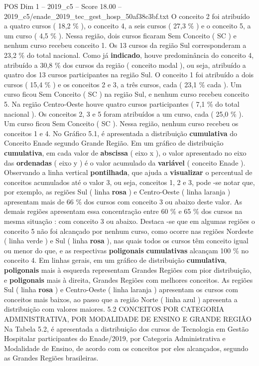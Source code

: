 \begin{textsample}{POS Dim 1 – 2019\_c5 – Score 18.00 – 2019\_c5/enade\_2019\_tec\_gest\_hosp\_50af38c3bf.txt}
O conceito 2 foi atribuído a quatro cursos ( 18,2 \% ), o conceito 4, a seis cursos ( 27,3 \% ) e o conceito 5, a um curso ( 4,5 \% ).
Nessa região, dois cursos ficaram Sem Conceito ( SC ) e nenhum curso recebeu conceito 1.
Os 13 cursos da região Sul corresponderam a 23,2 \% do total nacional.
Como já \textbf{indicado}, houve predominância do conceito 4, atribuído a 30,8 \% dos cursos da região ( conceito modal ), ou seja, atribuído a quatro dos 13 cursos participantes na região Sul.
O conceito 1 foi atribuído a dois cursos ( 15,4 \% ) e os conceitos 2 e 3, a três cursos, cada ( 23,1 \% cada ).
Um curso ficou Sem Conceito ( SC ) na região Sul, e nenhum curso recebeu conceito 5.
Na região Centro-Oeste houve quatro cursos participantes ( 7,1 \% do total nacional ).
Os conceitos 2, 3 e 5 foram atribuídos a um curso, cada ( 25,0 \% ).
Um curso ficou Sem Conceito ( SC ).
Nessa região, nenhum curso recebeu os conceitos 1 e 4.
No Gráfico 5.1, é apresentada a distribuição \textbf{cumulativa} do Conceito Enade segundo Grande Região.
Em um gráfico de distribuição \textbf{cumulativa}, em cada valor de \textbf{abscissa} ( eixo x ), o valor apresentado no eixo das \textbf{ordenadas} ( eixo y ) é o valor acumulado da \textbf{variável} ( conceito Enade ).
Observando a linha vertical \textbf{pontilhada}, que ajuda a \textbf{visualizar} o percentual de conceitos acumulados até o valor 3, ou seja, conceitos 1, 2 e 3, pode -se notar que, por exemplo, as regiões Sul ( linha \textbf{rosa} ) e Centro-Oeste ( linha laranja ) apresentam mais de 66 \% dos cursos com conceito 3 ou abaixo deste valor.
As demais regiões apresentam essa concentração entre 60 \% e 65 \% dos cursos na mesma situação : com conceito 3 ou abaixo.
Destaca -se que em algumas regiões o conceito 5 não foi alcançado por nenhum curso, como ocorre nas regiões Nordeste ( linha verde ) e Sul ( linha \textbf{rosa} ), nas quais todos os cursos têm conceito igual ou menor do que, e as respectivas \textbf{poligonais} \textbf{cumulativas} alcançam 100 \% no conceito 4.
Em linhas gerais, em um gráfico de distribuição \textbf{cumulativa}, \textbf{poligonais} mais à esquerda representam Grandes Regiões com pior distribuição, e \textbf{poligonais} mais à direita, Grandes Regiões com melhores conceitos.
As regiões Sul ( linha \textbf{rosa} ) e Centro-Oeste ( linha laranja ) apresentam os cursos com conceitos mais baixos, ao passo que a região Norte ( linha azul ) apresenta a distribuição com valores maiores. 5.2 CONCEITOS POR CATEGORIA ADMINISTRATIVA, POR MODALIDADE DE ENSINO E GRANDE REGIÃO Na Tabela 5.2, é apresentada a distribuição dos cursos de Tecnologia em Gestão Hospitalar participantes do Enade/2019, por Categoria Administrativa e Modalidade de Ensino, de acordo com os conceitos por eles alcançados, segundo as Grandes Regiões brasileiras.

\end{textsample}
